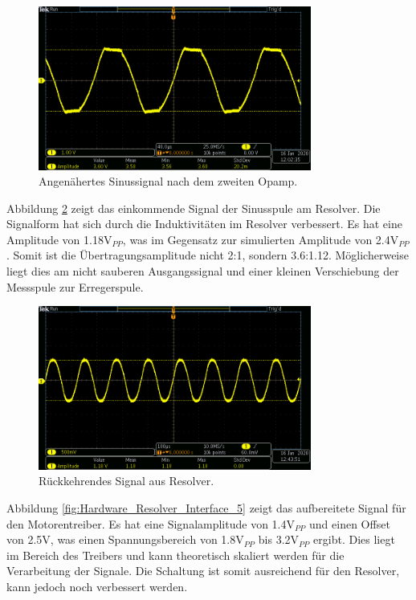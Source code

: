 \begin{figure}[h!]
	\centering
	\includegraphics[width=0.8\textwidth]{graphics/Resolver_Sin_Aus.png}
	\caption{Angenähertes Sinussignal nach dem zweiten Opamp.} 
	\label{fig:Hardware_Resolver_Interface_3}
\end{figure}

Abbildung \ref{fig:Hardware_Resolver_Interface_4} zeigt das einkommende Signal der Sinusspule am Resolver. Die Signalform hat sich durch die Induktivitäten im Resolver verbessert. Es hat eine Amplitude von 1.18V$_{PP}$, was im Gegensatz zur simulierten Amplitude von 2.4V$_{PP}$. Somit ist die Übertragungsamplitude nicht 2:1, sondern 3.6:1.12. Möglicherweise liegt dies am nicht sauberen Ausgangssignal und einer kleinen Verschiebung der Messspule zur Erregerspule.

\begin{figure}[h!]
	\centering
	\includegraphics[width=0.8\textwidth]{graphics/Resolver_Sin_Ein_1.png}
	\caption{Rückkehrendes Signal aus Resolver.} 
	\label{fig:Hardware_Resolver_Interface_4}
\end{figure}
\newpage


Abbildung \ref{fig:Hardware_Resolver_Interface_5} zeigt das aufbereitete Signal für den Motorentreiber. Es hat eine Signalamplitude von 1.4V$_{PP}$ und einen Offset von 2.5V, was einen Spannungsbereich von 1.8V$_{PP}$ bis 3.2V$_{PP}$ ergibt. Dies liegt im Bereich des Treibers und kann theoretisch skaliert werden für die Verarbeitung der Signale. Die Schaltung ist somit ausreichend für den Resolver, kann jedoch noch verbessert werden.

